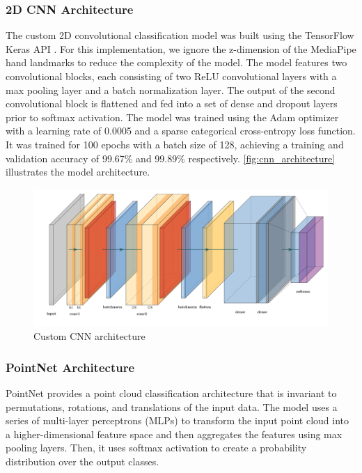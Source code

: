 \documentclass[../paper.tex]{subfiles}
\begin{document}
\subsubsection*{2D CNN Architecture}

The custom 2D convolutional classification model was built using the TensorFlow Keras API \cite{tensorflow,keras}. For this implementation, we ignore the z-dimension of the MediaPipe hand landmarks to reduce the complexity of the model. The model features two convolutional blocks, each consisting of two ReLU convolutional layers with a max pooling layer and a batch normalization layer. The output of the second convolutional block is flattened and fed into a set of dense and dropout layers prior to softmax activation. The model was trained using the Adam optimizer with a learning rate of 0.0005 and a sparse categorical cross-entropy loss function. It was trained for 100 epochs with a batch size of 128, achieving a training and validation accuracy of 99.67\% and 99.89\% respectively. \autoref{fig:cnn_architecture} illustrates the model architecture.

\begin{figure}[!htbp]
  \centerline{\includegraphics[width=\linewidth]{../figures/recognition-architecture.jpg}}
  \caption{Custom CNN architecture}\label{fig:cnn_architecture}
\end{figure}

\subsubsection*{PointNet Architecture}

 PointNet \cite{PointNet} provides a point cloud classification architecture that is invariant to permutations, rotations, and translations of the input data. The model uses a series of multi-layer perceptrons (MLPs) to transform the input point cloud into a higher-dimensional feature space and then aggregates the features using max pooling layers. Then, it uses softmax activation to create a probability distribution over the output classes.
\end{document}
